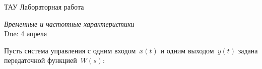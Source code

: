 \documentclass[a4paper,oneside,10pt]{book}
\theoremstyle{definition}
\begin{document}
\begin{center}
	{\large  ТАУ \hspace{0.1cm} Лабораторная работа }

	\vspace{5pt}
	\textit{\large Временные и частотные характеристики}\\ %
	\vspace{10pt}
	Due: 4 апреля %
\end{center}

\vspace{0.2 cm}



Пусть система управления с одним входом~$ x(t) $ и одним выходом~$ y(t) $ задана  передаточной функцией~$ W(s) $:
\end{document}
